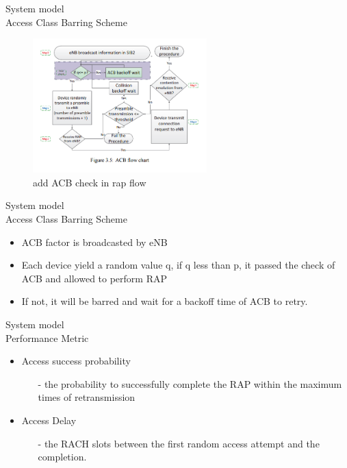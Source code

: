 \documentclass{beamer}
\begin{document}
\begin{frame}{{System model}\\Access Class Barring Scheme}
    \begin{figure}[t]
        \centering
        \includegraphics[width=0.6\textwidth]{figures/3_4.png}
        \caption{add ACB check in rap flow}
    \end{figure}
\end{frame}
\begin{frame}{{System model}\\Access Class Barring Scheme}
    \begin{itemize}
        \item{ACB factor is broadcasted by eNB}
        \item{Each device yield a random value q, if q  less than p, it passed the check of ACB and allowed to perform RAP}
        \item If not, it will be barred and wait for a backoff time of ACB to retry.
    \end{itemize}
\end{frame}

\begin{frame}{{System model}\\Performance Metric}
    \begin{itemize}
        \item Access success probability
        \begin{itemize}
            \item[-] the probability to successfully complete the RAP within the maximum times of retransmission
        \end{itemize}
        \item Access Delay
        \begin{itemize}
            \item[-] the RACH slots between the first random access attempt and the completion.
        \end{itemize}
    \end{itemize}
\end{frame}
\end{document}
